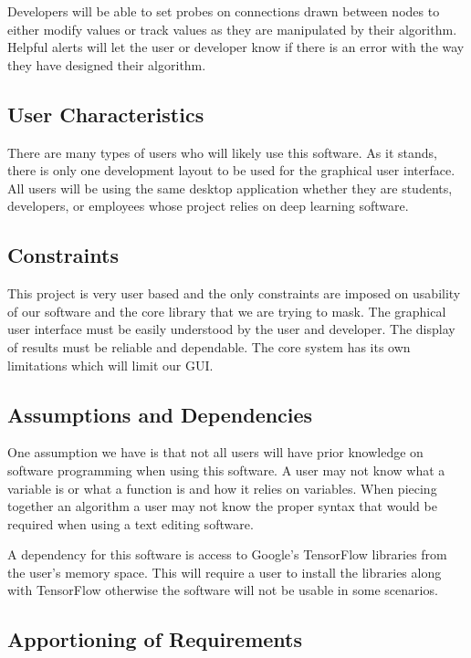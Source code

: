 \documentclass[journal,10pt,onecolumn,compsoc]{IEEEtran} \usepackage[margin=1.0in]{geometry} \usepackage{pdfpages} \usepackage{graphicx}
\begin{document}
Developers will be able to set probes on connections drawn between nodes to either modify values or track values as they are manipulated by their algorithm.
Helpful alerts will let the user or developer know if there is an error with the way they have designed their algorithm.

\subsection{User Characteristics}

There are many types of users who will likely use this software. 
As it stands, there is only one development layout to be used for the graphical user interface.
All users will be using the same desktop application whether they are students, developers, or employees whose project relies on deep learning software.

\subsection{Constraints}

This project is very user based and the only constraints are imposed on usability of our software and the core library that we are trying to mask.
The graphical user interface must be easily understood by the user and developer.
The display of results must be reliable and dependable.
The core system has its own limitations which will limit our GUI.

\subsection{Assumptions and Dependencies}

One assumption we have is that not all users will have prior knowledge on software programming when using this software.
A user may not know what a variable is or what a function is and how it relies on variables. 
When piecing together an algorithm a user may not know the proper syntax that would be required when using a text editing software.

A dependency for this software is access to Google's TensorFlow libraries from the user's memory space. 
This will require a user to install the libraries along with TensorFlow otherwise the software will not be usable in some scenarios.

\subsection{Apportioning of Requirements}
\end{document}
